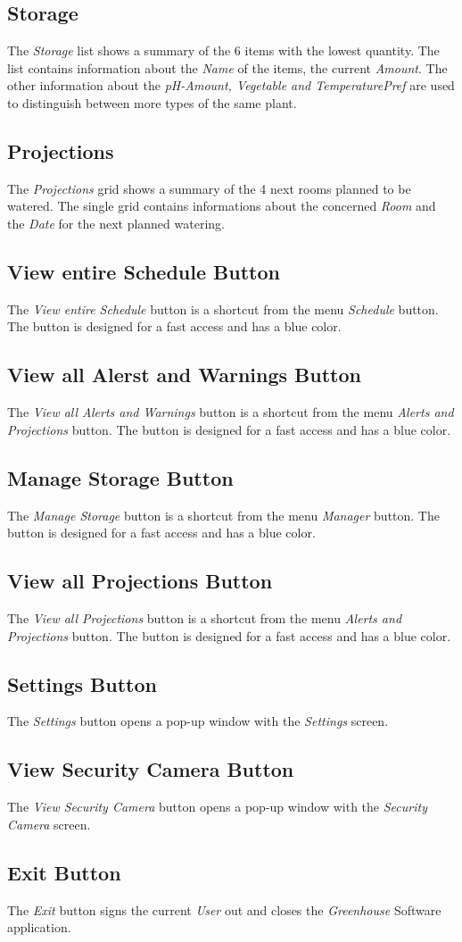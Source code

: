 \subsection{Storage}
The \emph{Storage} list shows a summary of the 6 items with the lowest quantity.
The list contains information about the \emph{Name} of the items, the current
\emph{Amount}. The other information about the \emph{pH-Amount, Vegetable and
TemperaturePref} are used to distinguish between more types of the same plant.

\subsection{Projections}
The \emph{Projections} grid shows a summary of the 4 next rooms planned
to be watered. The single grid contains informations about the concerned
\emph{Room} and the \emph{Date} for the next planned watering.

\subsection{View entire Schedule Button}
The \emph{View entire Schedule} button is a shortcut from the menu
\emph{Schedule} button. The button is designed for a fast access and has a blue
color.

\subsection{View all Alerst and Warnings Button}
The \emph{View all Alerts and Warnings} button is a shortcut from the menu
\emph{Alerts and Projections} button. The button is designed for a fast access
and has a blue color.

\subsection{Manage Storage Button}
The \emph{Manage Storage} button is a shortcut from the menu
\emph{Manager} button. The button is designed for a fast access and has a blue
color.

\subsection{View all Projections Button}
The \emph{View all Projections} button is a shortcut from the menu
\emph{Alerts and Projections} button. The button is designed for a fast access
and has a blue color.

\subsection{Settings Button}
The \emph{Settings} button opens a pop-up window with the \emph{Settings}
screen.

\subsection{View Security Camera Button}
The \emph{View Security Camera} button opens a pop-up window with the
\emph{Security Camera} screen.

\subsection{Exit Button}
The \emph{Exit} button signs the current \emph{User} out and closes the
\emph{Greenhouse} Software application.

